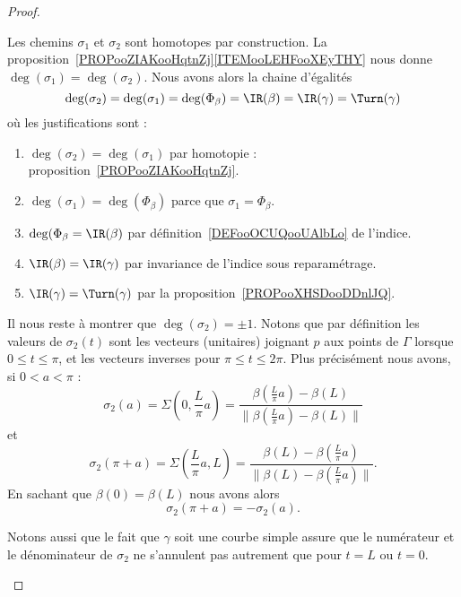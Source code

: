 \begin{proof}
\begin{subproof}
		Les chemins \( \sigma_1\) et \( \sigma_2\) sont homotopes par construction.
		La proposition~\ref{PROPooZIAKooHqtnZj}\ref{ITEMooLEHFooXEyTHY} nous donne \( \deg(\sigma_1)=\deg(\sigma_2)\). Nous avons alors la chaine d'égalités
		\begin{equation}        \label{EQooSXOAooZVOVxc}
			\deg(\sigma_2)=\deg(\sigma_1)=\deg(\Phi_{\beta})=\IR(\beta)=\IR(\gamma)=\Turn(\gamma)
		\end{equation}
		où les justifications sont :
		\begin{enumerate}
			\item
			      \( \deg(\sigma_2)=\deg(\sigma_1)\) par homotopie : proposition~\ref{PROPooZIAKooHqtnZj}.
			\item
			      \( \deg(\sigma_1)=\deg(\Phi_{\beta})\) parce que \( \sigma_1=\Phi_{\beta}\).
			\item
			      \( \deg(\Phi_{\beta}=\IR(\beta)\) par définition~\ref{DEFooOCUQooUAlbLo} de l'indice.
			\item
			      \(  \IR(\beta)=\IR(\gamma) \) par invariance de l'indice sous reparamétrage.
			\item
			      \( \IR(\gamma)=\Turn(\gamma)\) par la proposition~\ref{PROPooXHSDooDDnlJQ}.
		\end{enumerate}
		Il nous reste à montrer que \( \deg(\sigma_2)=\pm 1\).
		Notons que par définition les valeurs de \( \sigma_2(t)\) sont les vecteurs (unitaires) joignant \( p\) aux points de \( \Gamma\) lorsque \( 0\leq t\leq \pi\), et les vecteurs inverses pour \( \pi\leq t\leq 2\pi\). Plus précisément nous avons, si \( 0<a<\pi\) :
		\begin{equation}
			\sigma_2(a)=\Sigma(0,\frac{ L }{ \pi }a)=\frac{ \beta(\frac{ L }{ \pi }a)-\beta(L) }{ \|    \beta(\frac{ L }{ \pi }a)-\beta(L)   \| }
		\end{equation}
		et
		\begin{equation}
			\sigma_2(\pi+a)=\Sigma(\frac{ L }{\pi  }a,L)=\frac{ \beta(L)-\beta(\frac{ L }{ \pi }a) }{ \|   \beta(L)-\beta(\frac{ L }{ \pi }a) \| }.
		\end{equation}
		En sachant que \( \beta(0)=\beta(L)\) nous avons alors
		\begin{equation}        \label{EQooKMSRooEzWkyL}
			\sigma_2(\pi+a)=-\sigma_2(a).
		\end{equation}

		Notons aussi que le fait que \( \gamma\) soit une courbe simple assure que le numérateur et le dénominateur de \( \sigma_2\) ne s'annulent pas autrement que pour \( t=L\) ou \( t=0\).


\end{subproof}
\end{proof}

